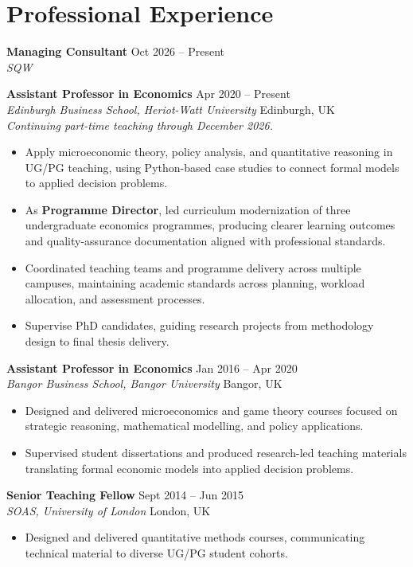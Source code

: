 \documentclass[11pt,a4paper]{article}
\begin{document}
\section{Professional Experience}

\textbf{Managing Consultant} \hfill Oct 2026 -- Present \\
\textit{SQW}

\vspace{4pt}
\noindent\textbf{Assistant Professor in Economics} \hfill Apr 2020 -- Present \\
\textit{Edinburgh Business School, Heriot-Watt University} \hfill Edinburgh, UK \\
\textit{Continuing part-time teaching through December 2026.}
\begin{itemize}[noitemsep, topsep=2pt]
    \item Apply microeconomic theory, policy analysis, and quantitative reasoning in UG/PG teaching, using Python-based case studies to connect formal models to applied decision problems.
    \item As \textbf{Programme Director}, led curriculum modernization of three undergraduate economics programmes, producing clearer learning outcomes and quality-assurance documentation aligned with professional standards.
    \item Coordinated teaching teams and programme delivery across multiple campuses, maintaining academic standards across planning, workload allocation, and assessment processes.
    \item Supervise PhD candidates, guiding research projects from methodology design to final thesis delivery.
\end{itemize}

\noindent\textbf{Assistant Professor in Economics} \hfill Jan 2016 -- Apr 2020 \\
\textit{Bangor Business School, Bangor University} \hfill Bangor, UK
\begin{itemize}[noitemsep, topsep=2pt]
    \item Designed and delivered microeconomics and game theory courses focused on strategic reasoning, mathematical modelling, and policy applications.
    \item Supervised student dissertations and produced research-led teaching materials translating formal economic models into applied decision problems.
\end{itemize}

\noindent\textbf{Senior Teaching Fellow} \hfill Sept 2014 -- Jun 2015 \\
\textit{SOAS, University of London} \hfill London, UK
\begin{itemize}[noitemsep, topsep=2pt]
    \item Designed and delivered quantitative methods courses, communicating technical material to diverse UG/PG student cohorts.
\end{itemize}
\end{document}
